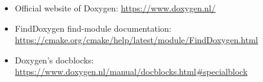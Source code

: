 

\begin{itemize}
\item
Official website of Doxygen:
\url{https://www.doxygen.nl/}

\item
FindDoxygen find-module documentation:
\url{https://cmake.org/cmake/help/latest/module/FindDoxygen.html}

\item
Doxygen’s docblocks:
\url{https://www.doxygen.nl/manual/docblocks.html#specialblock}
\end{itemize}
